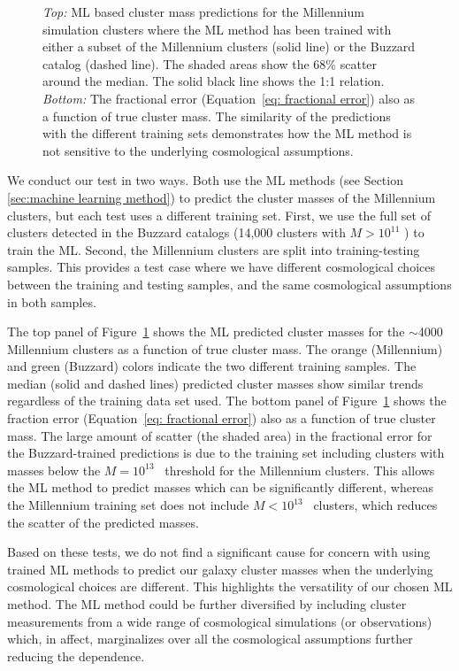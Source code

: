 \begin{figure}
\begin{center}
	\end{center}
	\caption[ML based cluster mass predictions in the Millennium Simulation]{\emph{Top:} ML based cluster mass predictions for the Millennium simulation clusters where the ML method has been trained with either a subset of the Millennium clusters (solid line) or the Buzzard catalog (dashed line). The shaded areas show the 68\% scatter around the median. The solid black line shows the 1:1 relation. \emph{Bottom:} The fractional error (Equation~\ref{eq: fractional error}) also as a function of true cluster mass. The similarity of the predictions with the different training sets demonstrates how the ML method is not sensitive to the underlying cosmological assumptions.}
	\label{fig: mill buzz comparison} 
\end{figure}

We conduct our test in two ways. Both use the ML methods (see Section \ref{sec:machine learning method}) to predict the cluster masses of the Millennium clusters, but each test uses a different training set. First, we use the full set of clusters detected in the Buzzard catalogs (14,000 clusters with $M > 10^{11}$ \msol) to train the ML. Second, the Millennium clusters are split into training-testing samples. This provides a test case where we have different cosmological choices between the training and testing samples, and the same cosmological assumptions in both samples. 

The top panel of Figure~\ref{fig: mill buzz comparison} shows the ML predicted cluster masses for the $\sim$4000 Millennium clusters as a function of true cluster mass. The orange (Millennium) and green (Buzzard) colors indicate the two different training samples. The median (solid and dashed lines) predicted cluster masses show similar trends regardless of the training data set used. The bottom panel of Figure~\ref{fig: mill buzz comparison} shows the fraction error (Equation~\ref{eq: fractional error}) also as a function of true cluster mass. The large amount of scatter (the shaded area) in the fractional error for the Buzzard-trained predictions is due to the training set including clusters with masses below the $M = 10^{13}$ \Msol\ threshold for the Millennium clusters. This allows the ML method to predict masses which can be significantly different, whereas the Millennium training set does not include $M < 10^{13}$ \Msol\ clusters, which reduces the scatter of the predicted masses.

Based on these tests, we do not find a significant cause for concern with using trained ML methods to predict our galaxy cluster masses when the underlying cosmological choices are different. This highlights the versatility of our chosen ML method. The ML method could be further diversified by including cluster measurements from a wide range of cosmological simulations (or observations) which, in affect, marginalizes over all the cosmological assumptions further reducing the dependence.

